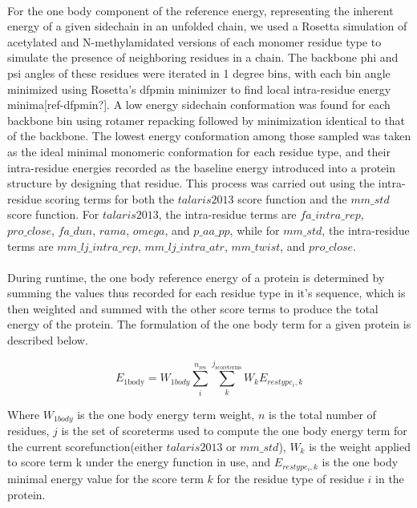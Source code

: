 \paragraph{}
For the one body component of the reference energy, representing the inherent energy of a given sidechain in an unfolded chain, we used a Rosetta simulation of acetylated and N-methylamidated versions of each monomer residue type to simulate the presence of neighboring residues in a chain.
The backbone phi and psi angles of these residues were iterated in 1 degree bins, with each bin angle minimized using Rosetta's dfpmin minimizer to find local intra-residue energy minima[ref-dfpmin?].
A low energy sidechain conformation was found for each backbone bin using rotamer repacking followed by minimization identical to that of the backbone.
The lowest energy conformation among those sampled was taken as the ideal minimal monomeric conformation for each residue type, and their intra-residue energies recorded as the baseline energy introduced into a protein structure by designing that residue.
This process was carried out using the intra-residue scoring terms for both the $talaris2013$ score function and the $mm\_std$ score function.
For $talaris2013$, the intra-residue terms are $fa\_intra\_rep$, $pro\_close$, $fa\_dun$, $rama$, $omega$, and $p\_aa\_pp$, while for $mm\_std$, the intra-residue terms are $mm\_lj\_intra\_rep$, $mm\_lj\_intra\_atr$, $mm\_twist$, and $pro\_close$.

\paragraph{}
During runtime, the one body reference energy of a protein is determined by summing the values thus recorded for each residue type in it's sequence, which is then weighted and summed with the other score terms to produce the total energy of the protein.
The formulation of the one body term for a given protein is described below.

\begin{equation}
E_{\text{1body}} = W_{1body} \sum_{i}^{n_{\text{res}}} \sum_{k}^{j_{\text{scoreterms}}} W_{k} E_{restype_{i},k}
\end{equation}

Where $W_{1body}$ is the one body energy term weight, $n$ is the total number of residues, $j$ is the set of scoreterms used to compute the one body energy term for the current scorefunction(either $talaris2013$ or $mm\_std$), $W_{k}$ is the weight applied to score term k under the energy function in use, and $E_{restype_{i},k}$ is the one body minimal energy value for the score term $k$ for the residue type of residue $i$ in the protein.


